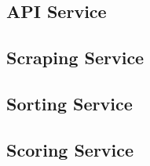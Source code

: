 \subsection{API Service}


\subsection{Scraping Service}


\subsection{Sorting Service}


\subsection{Scoring Service}


